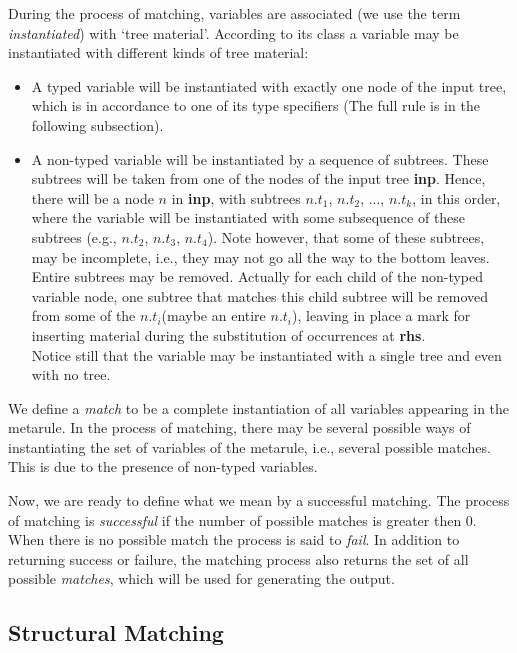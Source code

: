 During the process of matching, variables are associated (we use the
term {\it instantiated}) with `tree material'.  According to its class
a variable may be instantiated with different kinds of tree material:

\begin{itemize}
\item   A typed variable will be instantiated with exactly one node of
        the input tree, which is in accordance to one of its type specifiers
        (The full rule is in the following subsection). 

\item   A non-typed variable will be instantiated by a sequence of subtrees.
        These subtrees will be taken from one of the nodes of the input tree
        {\bf inp}. Hence, there will be a node $n$ in {\bf inp}, with subtrees
        $n.t_1$, $n.t_2$, ..., $n.t_k$, in this order, where the variable
        will be instantiated with some subsequence of these subtrees 
        (e.g., $n.t_2$, $n.t_3$, $n.t_4$). Note however, that some of these
        subtrees, may be incomplete, i.e., they may not go all the way to the 
        bottom leaves. Entire subtrees may be removed. Actually for each
        child of the non-typed variable node, one subtree that matches this
        child subtree will be removed from some of the $n.t_i$(maybe an entire
        $n.t_i$), leaving in place a mark for inserting material during the
        substitution of occurrences at {\bf rhs}.\\
        Notice still that the variable may
        be instantiated with a single tree and even with no tree. 

\end{itemize} 

We define a {\it match} to be a complete instantiation of all variables 
appearing in the metarule. In the process of matching, there may be several
possible ways of instantiating the set of variables of the metarule, i.e.,
several possible matches. This is due to the presence of non-typed variables.

Now, we are ready to define what we mean by a successful matching. The process
of matching is {\it successful} 
if the number of possible matches is greater then 0.
When there is no possible match the process is said to {\it fail}.
In addition to returning success or failure, the 
matching process also returns the set of
all possible {\it matches}, which will be used for generating the output.

\subsection{Structural Matching}

